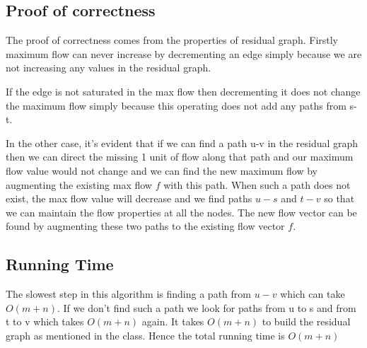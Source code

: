 \documentclass[11pt]{article}
\begin{document}
\subsection{Proof of correctness}

The proof of correctness comes from the properties of residual graph. Firstly maximum flow can never increase by decrementing an edge simply because we are not increasing any values in the residual graph. 

If the edge is not saturated in the max flow then decrementing it does not change the maximum flow simply because this operating does not add any paths from s-t. 

In the other case, it's evident that if we can find a path u-v in the residual graph then we can direct the missing 1 unit of flow along that path and our maximum flow value would not change and we can find the new maximum flow by augmenting the existing max flow $f$ with this path. When such a path does not exist, the max flow value will decrease and we find paths $u-s$ and $t-v$ so that we can maintain the flow properties at all the nodes. The new flow vector can be found by augmenting these two paths to the existing flow vector $f$.
\subsection{Running Time}
The slowest step in this algorithm is finding a path from $u-v$ which can take $O(m + n)$. If we don't find such a path we look for paths from u to s and from t to v which takes $O(m+n)$ again. It takes $O(m+n)$ to build the residual graph as mentioned in the class. Hence the total running time is $O(m+n)$
\end{document}
